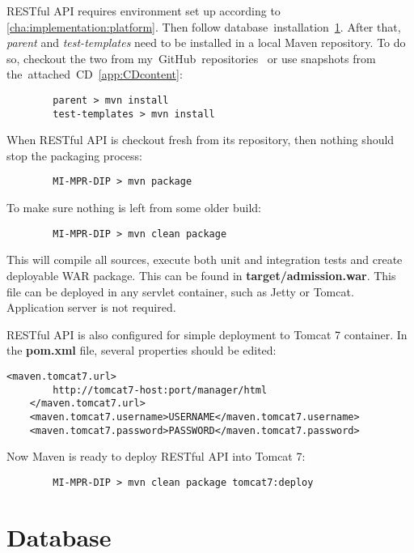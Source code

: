 	RESTful API requires environment set up according to \ref{cha:implementation:platform}. Then follow
	database~installation~\ref{app:deploy:database}. After that, \textit{parent} and \textit{test-templates} need to be
	installed in a local Maven repository. To do so, checkout the two from my~GitHub~repositories~\cite{github} or use
	snapshots from the~attached~CD~\ref{app:CDcontent}:
	
	\begin{verbatim}
		parent > mvn install
		test-templates > mvn install
	\end{verbatim}

	When RESTful API is checkout fresh from its repository, then nothing should stop the packaging process:

	\begin{verbatim}
		MI-MPR-DIP > mvn package
	\end{verbatim}
	
	To make sure  nothing is left from some older build:
	
	\begin{verbatim}
		MI-MPR-DIP > mvn clean package
	\end{verbatim}
	
	This will compile all sources, execute both unit and integration tests and create deployable WAR package. This can be
	found in \textbf{target/admission.war}. This file can be deployed in any servlet container, such as Jetty or Tomcat.
	Application server is not required.
	
	RESTful API is also configured for simple deployment to Tomcat 7 container. In the \textbf{pom.xml} file, several
	properties should be edited:

	\lstset{language=XML}
	\begin{lstlisting}[tabsize=2]
	<maven.tomcat7.url>
		http://tomcat7-host:port/manager/html
	</maven.tomcat7.url>
	<maven.tomcat7.username>USERNAME</maven.tomcat7.username>
	<maven.tomcat7.password>PASSWORD</maven.tomcat7.password>
	\end{lstlisting}

	Now Maven is ready to deploy RESTful API into Tomcat 7:

	\begin{verbatim}
		MI-MPR-DIP > mvn clean package tomcat7:deploy
	\end{verbatim}
	
	\section{Database}\label{app:deploy:database}
	
